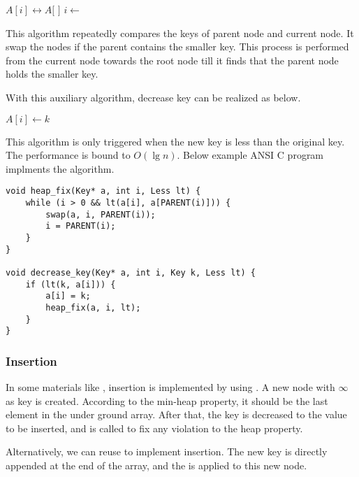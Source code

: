 \documentclass{article}
\begin{document}
\begin{algorithmic}[1]
    \State {} $A[i] \leftrightarrow A[$  $]$
    \State $i \gets$  
  \EndWhile
\EndFunction
\end{algorithmic}

This algorithm repeatedly compares the keys of parent node and
current node. It swap the nodes if
the parent contains the smaller key. This process is performed
from the current node towards the root node till it finds that
the parent node holds the smaller key.

With this auxiliary algorithm, decrease key can be realized
as below.

\begin{algorithmic}[1]
    \State $A[i] \gets k$
    \State {}
  \EndIf
\EndFunction
\end{algorithmic}

This algorithm is only triggered when the new key
is less than the original key. The performance is bound to $O(\lg n)$.
Below example ANSI C program implments the algorithm.

\lstset{language=C}
\begin{lstlisting}
void heap_fix(Key* a, int i, Less lt) {
    while (i > 0 && lt(a[i], a[PARENT(i)])) {
        swap(a, i, PARENT(i));
        i = PARENT(i);
    }
}

void decrease_key(Key* a, int i, Key k, Less lt) {
    if (lt(k, a[i])) {
        a[i] = k;
        heap_fix(a, i, lt);
    }
}
\end{lstlisting}

\subsubsection{Insertion}

In some materials like \cite{CLRS}, insertion is implemented by using .
A new node with $\infty$ as key is created. According
to the min-heap property, it should be the last element
in the under ground array. After that, the key is decreased to
the value to be inserted, and  is called
to fix any violation to the heap property.

Alternatively, we can reuse  to implement
insertion. The new key is directly appended at the end of the array,
and the  is applied to this new node.
\end{document}
